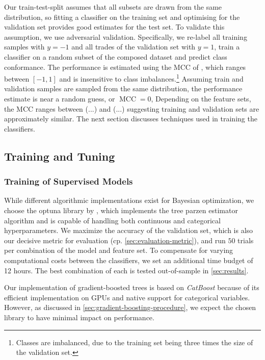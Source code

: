 Our train-test-split assumes that all subsets are drawn from the same distribution, so fitting a classifier on the training set and optimising for the validation set provides good estimates for the test set. To validate this assumption, we use adversarial validation. Specifically, we re-label all training samples with $y=-1$ and all trades of the validation set with $y=1$, train a classifier on a random subset of the composed dataset and predict class conformance. The performance is estimated using the \gls{MCC} of \textcite[][445]{matthewsComparisonPredictedObserved1975}, which ranges between $\left[-1, 1\right]$ and is insensitive to class imbalances.\footnote{Classes are imbalanced, due to the training set being three times the size of the validation set.} Assuming train and validation samples are sampled from the same distribution, the performance estimate is near a random guess, or $\operatorname{MCC} = 0$, Depending on the feature sets, the \gls{MCC} ranges between (...) and (...) suggesting training and validation sets are approximately similar. The next section discusses techniques used in training the classifiers.

\subsection{Training and Tuning}\label{sec:training-and-tuning}

\subsubsection{Training of Supervised
    Models}\label{sec:training-of-supervised-models}

While different algorithmic implementations exist for Bayesian optimization, we choose the optuna library by \textcite[][1--10]{akibaOptunaNextgenerationHyperparameter2019}, which implements the tree parzen estimator algorithm and is capable of handling both continuous and categorical hyperparameters. We maximize the accuracy of the validation set, which is also our decisive metric for evaluation (cp. \cref{sec:evaluation-metric}), and run $50$ trials per combination of the model and feature set. To compensate for varying computational costs between the classifiers, we set an additional time budget of 12 hours. The best combination of each is tested out-of-sample in \cref{sec:results}.

Our implementation of gradient-boosted trees is based on \emph{CatBoost} \autocite[][5--6]{prokhorenkovaCatBoostUnbiasedBoosting2018} because of its efficient implementation on \glspl{GPU} and native support for categorical variables. However, as discussed in \cref{sec:gradient-boosting-procedure}, we expect the chosen library to have minimal impact on performance.

